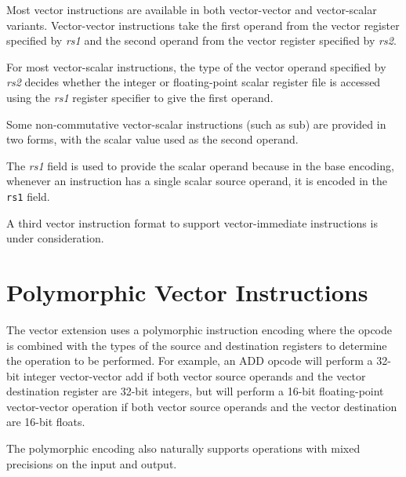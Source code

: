 Most vector instructions are available in both vector-vector and
vector-scalar variants.  Vector-vector instructions take the first
operand from the vector register specified by {\em rs1} and the second
operand from the vector register specified by {\em rs2}.

For most vector-scalar instructions, the type of the vector operand
specified by {\em rs2} decides whether the integer or floating-point
scalar register file is accessed using the {\em rs1} register
specifier to give the first operand.

Some non-commutative vector-scalar instructions (such as sub) are
provided in two forms, with the scalar value used as the second
operand.

\begin{commentary}
  The {\em rs1} field is used to provide the scalar operand because in
  the base encoding, whenever an instruction has a single scalar
  source operand, it is encoded in the {\tt rs1} field.
\end{commentary}

A third vector instruction format to support vector-immediate
instructions is under consideration.

\section{Polymorphic Vector Instructions}

The vector extension uses a polymorphic instruction encoding where the
opcode is combined with the types of the source and destination
registers to determine the operation to be performed.  For example, an
ADD opcode will perform a 32-bit integer vector-vector add if both
vector source operands and the vector destination register are 32-bit
integers, but will perform a 16-bit floating-point vector-vector
operation if both vector source operands and the vector destination
are 16-bit floats.

The polymorphic encoding also naturally supports operations with mixed
precisions on the input and output.

